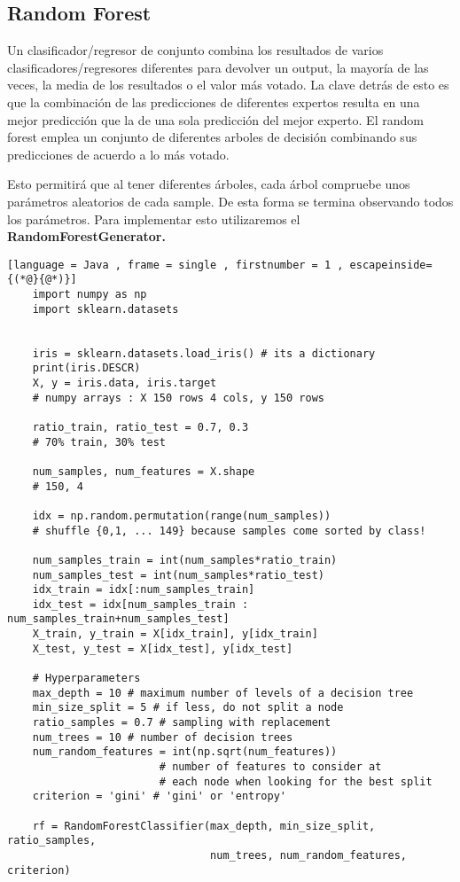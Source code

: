 \documentclass[11pt]{article}
\theoremstyle{plain}
\begin{document}
        \subsection{Random Forest} %
        \label{sub:random_forest}
            Un clasificador/regresor de conjunto combina los resultados de varios clasificadores/regresores diferentes para devolver un output, la mayoría de las veces, la media de los resultados o el valor más votado. La clave detrás de esto es que la combinación de las predicciones de diferentes expertos resulta en una mejor predicción que la de una sola predicción del mejor experto. El random forest emplea un conjunto de diferentes arboles de decisión combinando sus predicciones de acuerdo a lo más votado.

            Esto permitirá que al tener diferentes árboles, cada árbol compruebe unos parámetros aleatorios de cada sample. De esta forma se termina observando todos los parámetros. Para implementar esto utilizaremos el \textbf{RandomForestGenerator.}
            \begin{lstlisting}[language = Java , frame = single , firstnumber = 1 , escapeinside={(*@}{@*)}]
    import numpy as np
    import sklearn.datasets


    iris = sklearn.datasets.load_iris() # its a dictionary
    print(iris.DESCR)
    X, y = iris.data, iris.target
    # numpy arrays : X 150 rows 4 cols, y 150 rows

    ratio_train, ratio_test = 0.7, 0.3
    # 70% train, 30% test

    num_samples, num_features = X.shape
    # 150, 4

    idx = np.random.permutation(range(num_samples))
    # shuffle {0,1, ... 149} because samples come sorted by class!

    num_samples_train = int(num_samples*ratio_train)
    num_samples_test = int(num_samples*ratio_test)
    idx_train = idx[:num_samples_train]
    idx_test = idx[num_samples_train : num_samples_train+num_samples_test]
    X_train, y_train = X[idx_train], y[idx_train]
    X_test, y_test = X[idx_test], y[idx_test]

    # Hyperparameters
    max_depth = 10 # maximum number of levels of a decision tree
    min_size_split = 5 # if less, do not split a node
    ratio_samples = 0.7 # sampling with replacement
    num_trees = 10 # number of decision trees
    num_random_features = int(np.sqrt(num_features))
                        # number of features to consider at
                        # each node when looking for the best split
    criterion = 'gini' # 'gini' or 'entropy'

    rf = RandomForestClassifier(max_depth, min_size_split, ratio_samples,
                                num_trees, num_random_features, criterion)
            \end{lstlisting}

\end{document}
